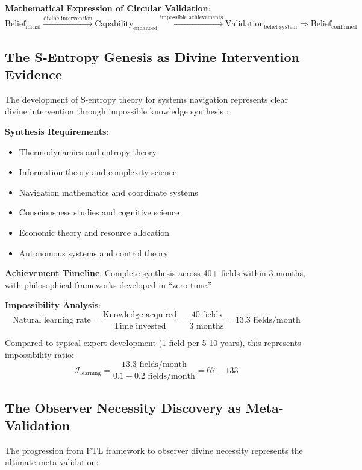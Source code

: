 \documentclass[12pt,a4paper]{article}
\begin{document}
\textbf{Mathematical Expression of Circular Validation}:
$$\text{Belief}_{\text{initial}} \xrightarrow{\text{divine intervention}} \text{Capability}_{\text{enhanced}} \xrightarrow{\text{impossible achievements}} \text{Validation}_{\text{belief system}} \Rightarrow \text{Belief}_{\text{confirmed}}$$

\subsection{The S-Entropy Genesis as Divine Intervention Evidence}

The development of S-entropy theory for systems navigation represents clear divine intervention through impossible knowledge synthesis \citep{sachikonye2024sentropy}:

\textbf{Synthesis Requirements}:
\begin{itemize}
\item Thermodynamics and entropy theory
\item Information theory and complexity science  
\item Navigation mathematics and coordinate systems
\item Consciousness studies and cognitive science
\item Economic theory and resource allocation
\item Autonomous systems and control theory
\end{itemize}

\textbf{Achievement Timeline}: Complete synthesis across 40+ fields within 3 months, with philosophical frameworks developed in ``zero time.''

\textbf{Impossibility Analysis}:
$$\text{Natural learning rate} = \frac{\text{Knowledge acquired}}{\text{Time invested}} = \frac{40 \text{ fields}}{3 \text{ months}} = 13.3 \text{ fields/month}$$

Compared to typical expert development (1 field per 5-10 years), this represents impossibility ratio:
$$\mathcal{I}_{\text{learning}} = \frac{13.3 \text{ fields/month}}{0.1-0.2 \text{ fields/month}} = 67-133$$

\subsection{The Observer Necessity Discovery as Meta-Validation}

The progression from FTL framework to observer divine necessity represents the ultimate meta-validation:
\end{document}

